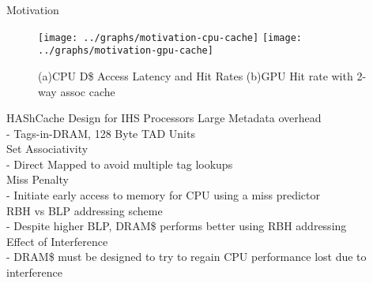 \documentclass[final,t]{beamer}
\begin{document}
\begin{frame}[t,fragile]{}
\begin{columns}[t]
\begin{column}{.47\linewidth}
\begin{exampleblock}{Motivation}
    \begin{figure}
       \texttt{[image: ../graphs/motivation-cpu-cache]}
       \texttt{[image: ../graphs/motivation-gpu-cache]}
       \caption{(a)CPU D\$ Access Latency and Hit Rates (b)GPU Hit rate with 2-way assoc cache}
       \label{fig:motivation-cpu-cache}
    \end{figure}  

    \end{exampleblock}
     


    \begin{exampleblock}{HAShCache Design for IHS Processors}
    \vspace{-0.2em}
        \quad Large Metadata overhead \\
        	\quad \qquad- Tags-in-DRAM, 128 Byte TAD Units \\
        \quad Set Associativity \\
        	\quad \qquad- Direct Mapped to avoid multiple tag lookups \\
        \quad Miss Penalty \\
        	\quad \qquad- Initiate early access to memory for CPU using a miss predictor \\
        \quad RBH vs BLP addressing scheme \\
	        \quad \qquad- Despite higher BLP, DRAM\$ performs better using RBH addressing\\
        \quad Effect of Interference \\
        	\quad \qquad- DRAM\$ must be designed to try to regain CPU performance lost due to interference\\
    \end{exampleblock}
	
\iffalse
	\begin{exampleblock} {Experimental Setup}
	{
	\footnotesize
	\begin{itemize}
		\item Cycle accurate, modified gem5-gpu simulator
		\item 5 OoO x86-64 cores @2.5GHz running multi-programmed SPEC 2006 workload
		\item Private 32KB I/D L1, 1MB shared split L2 - all coherent
		\item 8 Fermi-like SMs @700MHz running mem-copy elided Rodinia workload
		\item 64KB private L1 non-coherent, 512KB Coherent L2 cache
		\item Stacked DRAM (HMC\_2500\_x64) - 64MB, 2 vault, 8 layers/vault, peak B/W 40GB/s
		\item off-chip DRAM (DDR3\_1600\_x64) - 8GB, 2 channel, 1 rank/channel, peak B/W 25GB/s
	\end{itemize}
	}
	\end{exampleblock}	
\fi	
	

\end{column}
\end{columns}
\end{frame}
\end{document}
